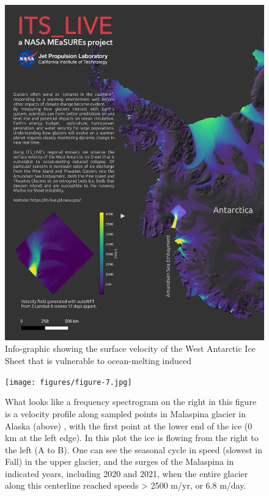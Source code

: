 \documentclass[
  super,
  preprint,
  3p,
  twocolumn]{elsarticle}
\begin{document}
\begin{figure}

{\centering 

\includegraphics{figures/figure-6.jpg}

}

\caption{\label{fig-4}Info-graphic showing the surface velocity of the
West Antarctic Ice Sheet that is vulnerable to ocean-melting induced
\citep[collapse][]{Joughin2011-mq, Greene2022-uo, Naughten2023}}

\end{figure}

\begin{figure}

{\centering 

\texttt{[image: figures/figure-7.jpg]}

}

\caption{\label{fig-5}What looks like a frequency spectrogram on the
right in this figure is a velocity profile along sampled points in
Malaspina glacier in Alaska (above) , with the first point at the lower
end of the ice (0 km at the left edge). In this plot the ice is flowing
from the right to the left (A to B). One can see the seasonal cycle in
speed (slowest in Fall) in the upper glacier, and the surges of the
Malaspina in indicated years, including 2020 and 2021, when the entire
glacier along this centerline reached speeds \textgreater{} 2500 m/yr,
or 6.8 m/day.}

\end{figure}
\end{document}
